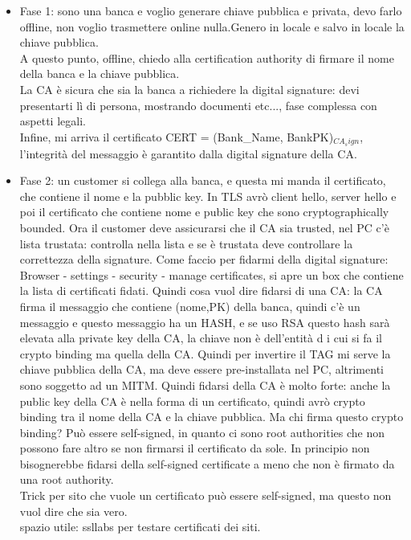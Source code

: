 \documentclass[16px]{article}
\begin{document}
\begin{itemize}
\item Fase 1: sono una banca e voglio generare chiave pubblica e privata, devo farlo offline, non voglio trasmettere online nulla.Genero in locale e salvo in locale la chiave pubblica.\\ A questo punto, offline, chiedo alla certification authority di firmare il nome della banca e la chiave pubblica.\\ La CA è sicura che sia la banca a richiedere la digital signature: devi presentarti lì di persona, mostrando documenti etc..., fase complessa con aspetti legali.\\ Infine, mi arriva il certificato CERT = (Bank\_Name, BankPK)$_{CA_sign}$, l'integrità del messaggio è garantito dalla digital signature della CA.
\item Fase 2: un customer si collega alla banca, e questa mi manda il certificato, che contiene il nome e la pubblic key. In TLS avrò client hello, server hello e poi il certificato che contiene nome e public key che sono cryptographically bounded. Ora il customer deve assicurarsi che il CA sia trusted, nel PC c'è lista trustata: controlla nella lista e se è trustata deve controllare la correttezza della signature. Come faccio per fidarmi della digital signature: Browser - settings - security - manage certificates, si apre un box che contiene la lista di certificati fidati. Quindi cosa vuol dire fidarsi di una CA: la CA firma il messaggio che contiene (nome,PK) della banca, quindi c'è un messaggio e questo messaggio ha un HASH, e se uso RSA questo hash sarà elevata alla private key della CA, la chiave non è dell'entità d i cui si fa il crypto binding ma quella della CA. Quindi per invertire il TAG mi serve la chiave pubblica della CA, ma deve essere pre-installata nel PC, altrimenti sono soggetto ad un MITM. Quindi fidarsi della CA è molto forte: anche la public key della CA è nella forma di un certificato, quindi avrò crypto binding tra il nome della CA e la chiave pubblica. Ma chi firma questo crypto binding? Può essere self-signed, in quanto ci sono root authorities che non possono fare altro se non firmarsi il certificato da sole. In principio non bisognerebbe fidarsi della self-signed certificate a meno che non è firmato da una root authority.\\ Trick per sito che vuole un certificato può essere self-signed, ma questo non vuol dire che sia vero.\\ 
spazio utile: ssllabs per testare certificati dei siti.\\  
\end{itemize}
\end{document}
